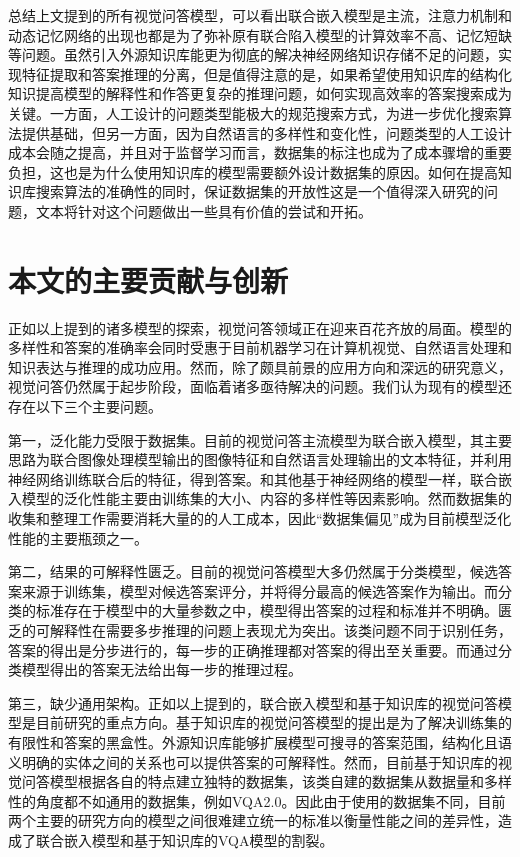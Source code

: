 总结上文提到的所有视觉问答模型，可以看出联合嵌入模型是主流，注意力机制和动态记忆网络的出现也都是为了弥补原有联合陷入模型的计算效率不高、记忆短缺等问题。虽然引入外源知识库能更为彻底的解决神经网络知识存储不足的问题，实现特征提取和答案推理的分离，但是值得注意的是，如果希望使用知识库的结构化知识提高模型的解释性和作答更复杂的推理问题，如何实现高效率的答案搜索成为关键。一方面，人工设计的问题类型能极大的规范搜索方式，为进一步优化搜索算法提供基础，但另一方面，因为自然语言的多样性和变化性，问题类型的人工设计成本会随之提高，并且对于监督学习而言，数据集的标注也成为了成本骤增的重要负担，这也是为什么使用知识库的模型需要额外设计数据集的原因。如何在提高知识库搜索算法的准确性的同时，保证数据集的开放性这是一个值得深入研究的问题，文本将针对这个问题做出一些具有价值的尝试和开拓。

\section{本文的主要贡献与创新}
正如以上提到的诸多模型的探索，视觉问答领域正在迎来百花齐放的局面。模型的多样性和答案的准确率会同时受惠于目前机器学习在计算机视觉、自然语言处理和知识表达与推理的成功应用。然而，除了颇具前景的应用方向和深远的研究意义，视觉问答仍然属于起步阶段，面临着诸多亟待解决的问题。我们认为现有的模型还存在以下三个主要问题。

第一，泛化能力受限于数据集。目前的视觉问答主流模型为联合嵌入模型，其主要思路为联合图像处理模型输出的图像特征和自然语言处理输出的文本特征，并利用神经网络训练联合后的特征，得到答案。和其他基于神经网络的模型一样，联合嵌入模型的泛化性能主要由训练集的大小、内容的多样性等因素影响。然而数据集的收集和整理工作需要消耗大量的的人工成本，因此“数据集偏见”成为目前模型泛化性能的主要瓶颈之一。

第二，结果的可解释性匮乏。目前的视觉问答模型大多仍然属于分类模型，候选答案来源于训练集，模型对候选答案评分，并将得分最高的候选答案作为输出。而分类的标准存在于模型中的大量参数之中，模型得出答案的过程和标准并不明确。匮乏的可解释性在需要多步推理的问题上表现尤为突出。该类问题不同于识别任务，答案的得出是分步进行的，每一步的正确推理都对答案的得出至关重要。而通过分类模型得出的答案无法给出每一步的推理过程。

第三，缺少通用架构。正如以上提到的，联合嵌入模型和基于知识库的视觉问答模型是目前研究的重点方向。基于知识库的视觉问答模型的提出是为了解决训练集的有限性和答案的黑盒性。外源知识库能够扩展模型可搜寻的答案范围，结构化且语义明确的实体之间的关系也可以提供答案的可解释性。然而，目前基于知识库的视觉问答模型根据各自的特点建立独特的数据集，该类自建的数据集从数据量和多样性的角度都不如通用的数据集，例如VQA2.0。因此由于使用的数据集不同，目前两个主要的研究方向的模型之间很难建立统一的标准以衡量性能之间的差异性，造成了联合嵌入模型和基于知识库的VQA模型的割裂。

